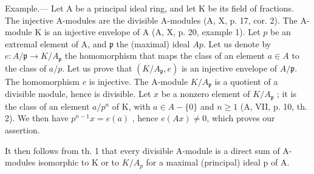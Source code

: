 Example.--- Let A be a principal ideal ring, and let K be its field of fractions. The injective A-modules are the divisible A-modules (A, X, p. 17, cor. 2). The A-module K is an injective envelope of A (A, X, p. 20, example 1). Let \(p\) be an extremal element of A, and \(\mathfrak{p}\) the (maximal) ideal \(Ap\). Let us denote by \(e: A/\mathfrak{p} \longrightarrow K/A_{\mathfrak{p}}\) the homomorphism that maps the class of an element \(a \in A\) to the class of \(a/p\). Let us prove that \((K/A_{\mathfrak{p}}, e)\) is an injective envelope of \(A/\mathfrak{p}\). The homomorphism \(e\) is injective. The A-module \(K/A_{\mathfrak{p}}\) is a quotient of a divisible module, hence is divisible. Let \(x\) be a nonzero element of \(K/A_{\mathfrak{p}}\) ; it is the class of an element \(a/p^n\) of K, with \(a \in A - \{0\}\) and \(n \geqslant 1\) (A, VII, p. 10, th. 2). We then have \(p^{n-1}x = e(a)\) , hence \(e(Ax) \neq 0\), which proves our assertion.

It then follows from th. 1 that every divisible A-module is a direct sum of A-modules isomorphic to K or to \(K/A_{p}\) for a maximal (principal) ideal p of A.

